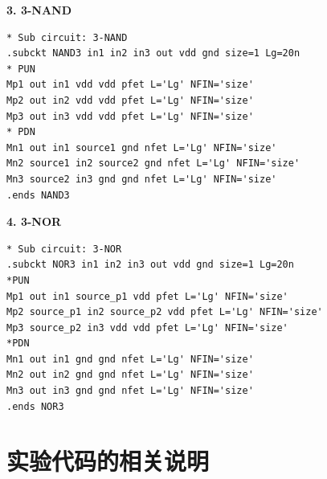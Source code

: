 \documentclass[UTF8,12pt,a4paper]{ctexart}
\begin{document}
\textbf{3. 3-NAND}
\begin{lstlisting}
* Sub circuit: 3-NAND
.subckt NAND3 in1 in2 in3 out vdd gnd size=1 Lg=20n
* PUN
Mp1 out in1 vdd vdd pfet L='Lg' NFIN='size'
Mp2 out in2 vdd vdd pfet L='Lg' NFIN='size'
Mp3 out in3 vdd vdd pfet L='Lg' NFIN='size'
* PDN
Mn1 out in1 source1 gnd nfet L='Lg' NFIN='size'
Mn2 source1 in2 source2 gnd nfet L='Lg' NFIN='size'
Mn3 source2 in3 gnd gnd nfet L='Lg' NFIN='size'
.ends NAND3
\end{lstlisting}

\textbf{4. 3-NOR}
\begin{lstlisting}
* Sub circuit: 3-NOR
.subckt NOR3 in1 in2 in3 out vdd gnd size=1 Lg=20n
*PUN
Mp1 out in1 source_p1 vdd pfet L='Lg' NFIN='size'
Mp2 source_p1 in2 source_p2 vdd pfet L='Lg' NFIN='size'
Mp3 source_p2 in3 vdd vdd pfet L='Lg' NFIN='size'
*PDN
Mn1 out in1 gnd gnd nfet L='Lg' NFIN='size'
Mn2 out in2 gnd gnd nfet L='Lg' NFIN='size'
Mn3 out in3 gnd gnd nfet L='Lg' NFIN='size'
.ends NOR3
\end{lstlisting}

\section{实验代码的相关说明}
\end{document}
